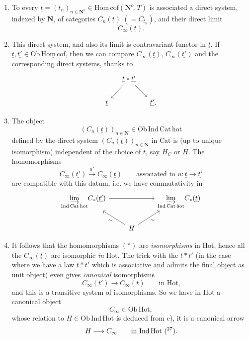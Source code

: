 \documentclass[11pt]{article}
\newcommand{\printedpage}[1]{\marginpar{\footnotesize p.~#1}}
\newcommand{\msp}[1]{\marginpar{\footnotesize [#1]}}
\newcommand{\Hot}{\mathrm{Hot}}
\newcommand{\Hc}{\underline{\mathrm{Hom\,cof}}}
\newcommand{\Nop}{\mathbf{N}^o}
\begin{document}
\begin{enumerate}
\item[a)] To every $\underline{t} = (t_n)_{n \in \Nop} \in \Hc(\Nop, T)$ is associated a direct system, indexed by $\mathbf{N}$, of categories $C_n(\underline{t})$ $(= C_{t_n})$, and their direct limit
\[
C_\infty(\underline{t}).
\]

\printedpage{77}
\item[b)] This direct system, and also its limit is contravariant functor in $\underline{t}$. If $\underline{t}, \underline{t'} \in \mathrm{Ob}\,\Hc$, then we can compare $C_\infty(\underline{t})$, $C_\infty(\underline{t'})$ and the corresponding direct systems, thanks to
\[
\begin{tikzcd}[column sep=small]
 & \underline{t} * \underline{t'} \arrow[ld] \arrow[rd] & \\
\underline{t} & & \underline{t'}.
\end{tikzcd}
\]

\item[c)] The object
\[
(C_n(\underline{t}))_{n \in \mathbf{N}} \in \mathrm{Ob\,Ind\,Cat\,hot}
\]
defined by the direct system $(C_n(\underline{t}))_{n \in \mathbf{N}}$ in Cat is (up to unique isomorphism) independent of the choice of $\underline{t}$, say $H_C$ or $H$. The homomorphisms
\[
C_\infty(\underline{t'}) \xrightarrow{u^*} C_\infty(\underline{t}) \qquad \text{associated to } u : \underline{t} \longrightarrow \underline{t'} \tag*{$(*)$}
\]
are compatible with this datum, i.e. we have commutativity in
\[
\begin{tikzcd}
\underset{\mathrm{Ind\,Cat\,hot}}{\varinjlim} C_*(\underline{t'}) \arrow[rr] & & \underset{\mathrm{Ind\,Cat\,hot}}{\varinjlim} C_*(\underline{t}) \\
 & H \arrow[lu, "\sim"] \arrow[ru, "\sim"'] &
\end{tikzcd}
\]

\msp{page 123}
\item[d)] It follows that the homomorphisms $(*)$ are \textit{isomorphisms} in Hot, hence all the $C_\infty(\underline{t})$ are isomorphic \textit{in} Hot. The trick with the $t * t'$ (in the case where we have a law $t * t'$ which is associative and admits the final object as unit object) even gives \textit{canonical} isomorphisms
\[
C_\infty(\underline{t'}) \longrightarrow C_\infty(\underline{t}) \qquad \text{in Hot,}
\]
and this is a transitive system of isomorphisms. So we have in Hot a canonical object
\[
C_\infty \in \mathrm{Ob}\,\Hot,
\]
whose relation to $H \in \mathrm{Ob\,Ind\,Hot}$ is deduced from c), it is a canonical arrow
\[
H \longrightarrow C_\infty \qquad \text{in Ind\,Hot (\footnotemark[27]).}
\]


\end{enumerate}
\end{document}
